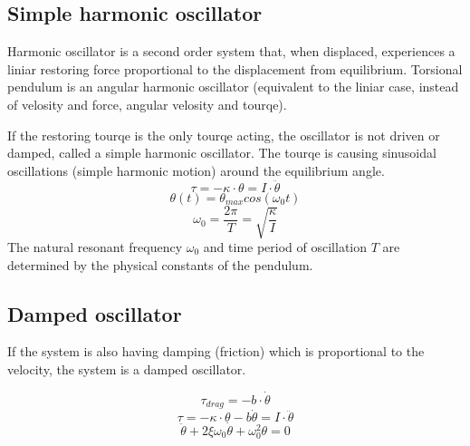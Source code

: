 \documentclass[\main/master.tex]{subfiles}
\begin{document}
\subsection{Simple harmonic oscillator}
Harmonic oscillator is a second order system that, when displaced, experiences a liniar restoring force proportional to the displacement from equilibrium. Torsional pendulum is an angular harmonic oscillator (equivalent to the liniar case, instead of velosity and force, angular velosity and tourqe).
\par

If the restoring tourqe is the only tourqe acting, the oscillator is not driven or damped, called a simple harmonic oscillator. The tourqe is causing sinusoidal oscillations (simple harmonic motion) around the equilibrium angle.  
\begin{equation}
\tau = -\kappa\cdot\theta  = I\cdot\ddot{\theta}   \label{eqn:undamped_motion_equation}
\end{equation}
\begin{equation}
\theta(t) = \theta_{max}cos(\omega_0 t )    \label{eqn:undamped_motion_equation}
\end{equation}
\begin{equation}
\omega_0  = \frac{2\pi}{T} = \sqrt{\frac{\kappa}{I}}   \label{eqn:undamped_motion_equation}
\end{equation}
The natural resonant frequency $\omega_0$ and time period of oscillation $T$ are determined by the physical constants of the pendulum.


\subsection{Damped oscillator}
If the system is also having damping (friction) which is proportional to the velocity, the system is a damped oscillator.


\begin{equation}
\tau_{drag} = -b\cdot\dot{\theta}   \label{eqn:friction_tourqe}
\end{equation} 
\begin{equation}
\tau = -\kappa\cdot\theta - b\dot{\theta}  = I\cdot\ddot{\theta}   \label{eqn:damped_motion_equation}
\end{equation} 
\begin{equation}
\ddot{\theta} + 2\xi\omega_0\dot{\theta} + \omega_0^2\theta = 0   \label{eqn:damped_motion_equation}
\end{equation}
\end{document}
